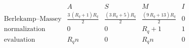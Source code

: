 \[
\begin{array}{l|cccc}
 & A & S & M & I \\
\hline
\text{Berlekamp--Massey} & \displaystyle \frac{3 \, {\left(R_{q} + 1\right)} R_{q}}{2} & \displaystyle \frac{{\left(3 \, R_{q} + 5\right)} R_{q}}{2} & \displaystyle \frac{{\left(9 \, R_{q} + 13\right)} R_{q}}{2} & 0 \\
\text{normalization} & 0 & 0 & R_{q} + 1 & 1 \\
\text{evaluation} & R_{q} n & 0 & R_{q} n & 0 \\
\end{array}
\]
